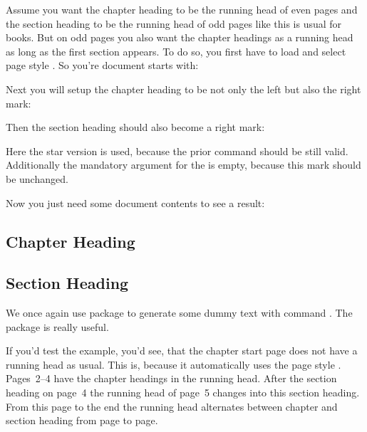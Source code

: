 \ifCommonscrlayerscrpage%
\begin{Example}
  Assume you want the chapter heading to be the running head of even pages
  and the section heading to be the running head of odd pages like this is
  usual for books. But on odd pages you also want the chapter headings as a
  running head as long as the first section appears. To do so, you first have
  to load  and select page style
  . So you're document starts with:
  Next you will setup the chapter heading to be not only the left but also the
  right mark:
\begin{lstcode}
\end{lstcode}
  Then the section heading should also become a right mark:
\begin{lstcode}
   \automark*[section]{}
\end{lstcode}
  Here the star version is used, because the prior  command
  should be still valid. Additionally the mandatory argument for the
   is empty, because this mark should be
  unchanged.

  Now you just need some document contents to see a result:
\begin{lstcode}
  \usepackage{lipsum}
  
  \chapter{Chapter Heading}
  \lipsum[1-20]
  \section{Section Heading}
  \lipsum[21-40]
  
\end{lstcode}
  We once again use package  to generate
  some dummy text with command . The package is
  really useful.

  If you'd test the example, you'd see, that the chapter start page does not
  have a running head as usual. This is, because it automatically uses the
   page style . Pages~2--4 have
  the chapter headings in the running head. After the section heading on
  page~4 the running head of page~5 changes into this section heading. From
  this page to the end the running head alternates between chapter and section
  heading from page to page.
\end{Example}
\fi %

